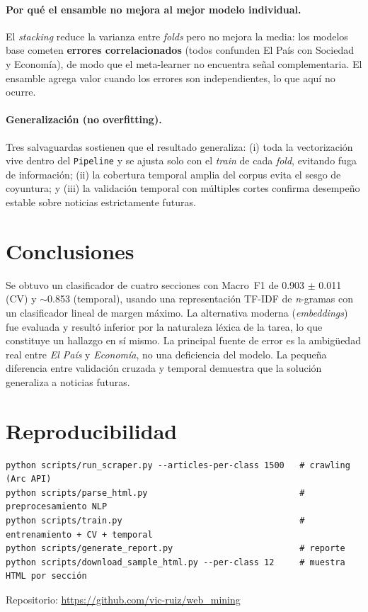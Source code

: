 \documentclass[11pt,a4paper]{article}
\newcommand{\bestCVfone}{0.903 $\pm$ 0.011}
\newcommand{\tempFmean}{0.853}
\begin{document}
\paragraph{Por qué el ensamble no mejora al mejor modelo individual.}
El \emph{stacking} reduce la varianza entre \emph{folds} pero no mejora la media:
los modelos base cometen \textbf{errores correlacionados} (todos confunden El País
con Sociedad y Economía), de modo que el meta-learner no encuentra señal
complementaria. El ensamble agrega valor cuando los errores son independientes, lo
que aquí no ocurre.

\paragraph{Generalización (no overfitting).}
Tres salvaguardas sostienen que el resultado generaliza: (i) toda la
vectorización vive dentro del \texttt{Pipeline} y se ajusta solo con el \emph{train}
de cada \emph{fold}, evitando fuga de información; (ii) la cobertura temporal amplia
del corpus evita el sesgo de coyuntura; y (iii) la validación temporal con múltiples
cortes confirma desempeño estable sobre noticias estrictamente futuras.

\section{Conclusiones}
Se obtuvo un clasificador de cuatro secciones con Macro~F1 de \bestCVfone{} (CV) y
$\sim$\tempFmean{} (temporal), usando una representación TF-IDF de \emph{n}-gramas
con un clasificador lineal de margen máximo. La alternativa moderna
(\emph{embeddings}) fue evaluada y resultó inferior por la naturaleza léxica de la
tarea, lo que constituye un hallazgo en sí mismo. La principal fuente de error es la
ambigüedad real entre \emph{El País} y \emph{Economía}, no una deficiencia del
modelo. La pequeña diferencia entre validación cruzada y temporal demuestra que la
solución generaliza a noticias futuras.

\appendix
\section{Reproducibilidad}
\begin{verbatim}
python scripts/run_scraper.py --articles-per-class 1500   # crawling (Arc API)
python scripts/parse_html.py                              # preprocesamiento NLP
python scripts/train.py                                   # entrenamiento + CV + temporal
python scripts/generate_report.py                         # reporte
python scripts/download_sample_html.py --per-class 12     # muestra HTML por sección
\end{verbatim}
Repositorio: \url{https://github.com/vic-ruiz/web_mining}
\end{document}

